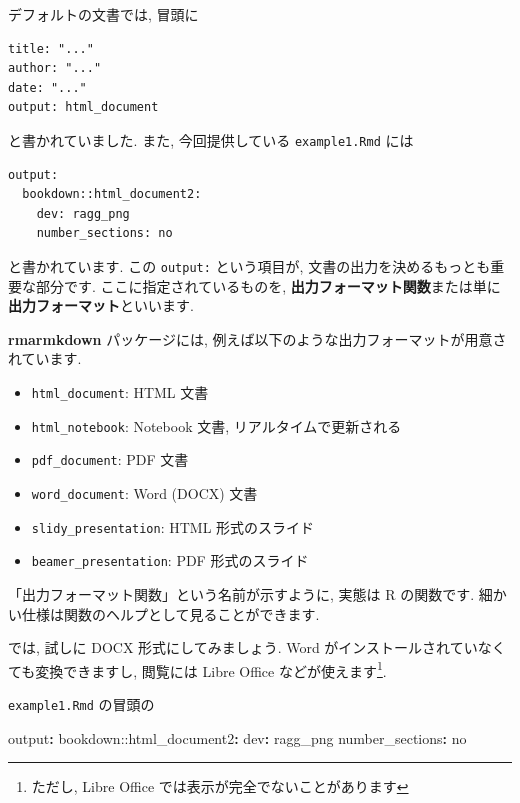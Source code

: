 \documentclass[
]{ltjsarticle}
\newenvironment{Shaded}{\begin{snugshade}}{\end{snugshade}}
\newcommand{\AttributeTok}[1]{\textcolor[rgb]{0.77,0.63,0.00}{#1}}
\newcommand{\CharTok}[1]{\textcolor[rgb]{0.31,0.60,0.02}{#1}}
\newcommand{\FunctionTok}[1]{\textcolor[rgb]{0.00,0.00,0.00}{#1}}
\newcommand{\KeywordTok}[1]{\textcolor[rgb]{0.13,0.29,0.53}{\textbf{#1}}}
\providecommand{\tightlist}{%
  \setlength{\itemsep}{0pt}\setlength{\parskip}{0pt}}
\begin{document}
デフォルトの文書では, 冒頭に

\begin{verbatim}
title: "..."
author: "..."
date: "..."
output: html_document
\end{verbatim}

と書かれていました. また, 今回提供している \texttt{example1.Rmd} には

\begin{verbatim}
output:
  bookdown::html_document2:
    dev: ragg_png
    number_sections: no
\end{verbatim}

と書かれています. この \texttt{output:} という項目が, 文書の出力を決めるもっとも重要な部分です. ここに指定されているものを, \textbf{出力フォーマット関数}または単に\textbf{出力フォーマット}といいます.

\textbf{rmarmkdown} パッケージには, 例えば以下のような出力フォーマットが用意されています.

\begin{itemize}
\tightlist
\item
  \texttt{html\_document}: HTML 文書
\item
  \texttt{html\_notebook}: Notebook 文書, リアルタイムで更新される
\item
  \texttt{pdf\_document}: PDF 文書
\item
  \texttt{word\_document}: Word (DOCX) 文書
\item
  \texttt{slidy\_presentation}: HTML 形式のスライド
\item
  \texttt{beamer\_presentation}: PDF 形式のスライド
\end{itemize}

「出力フォーマット関数」という名前が示すように, 実態は R の関数です. 細かい仕様は関数のヘルプとして見ることができます.

では, 試しに DOCX 形式にしてみましょう. Word がインストールされていなくても変換できますし, 閲覧には Libre Office などが使えます\footnote{ただし, Libre Office では表示が完全でないことがあります}.

\texttt{example1.Rmd} の冒頭の

\begin{Shaded}
\begin{Highlighting}[]
\FunctionTok{output}\KeywordTok{:}
\AttributeTok{  bookdown:}\FunctionTok{:html\_document2}\KeywordTok{:}
\AttributeTok{    }\FunctionTok{dev}\KeywordTok{:}\AttributeTok{ ragg\_png}
\AttributeTok{    }\FunctionTok{number\_sections}\KeywordTok{:}\AttributeTok{ }\CharTok{no}
\end{Highlighting}
\end{Shaded}
\end{document}
